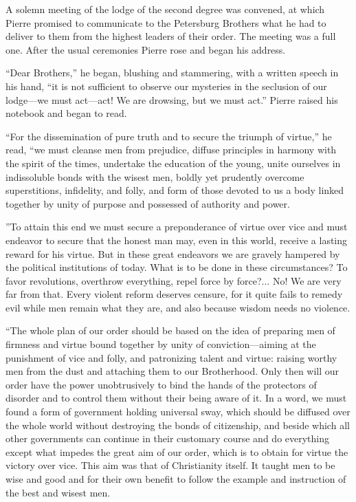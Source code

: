 A solemn meeting of the lodge of the second degree was convened,
at which Pierre promised to communicate to the Petersburg
Brothers what he had to deliver to them from the highest leaders
of their order. The meeting was a full one. After the usual
ceremonies Pierre rose and began his address.

``Dear Brothers,'' he began, blushing and stammering, with a
written speech in his hand, ``it is not sufficient to observe our
mysteries in the seclusion of our lodge---we must act---act! We
are drowsing, but we must act.'' Pierre raised his notebook and
began to read.

``For the dissemination of pure truth and to secure the triumph
of virtue,'' he read, ``we must cleanse men from prejudice,
diffuse principles in harmony with the spirit of the times,
undertake the education of the young, unite ourselves in
indissoluble bonds with the wisest men, boldly yet prudently
overcome superstitions, infidelity, and folly, and form of those
devoted to us a body linked together by unity of purpose and
possessed of authority and power.

''To attain this end we must secure a preponderance of virtue
over vice and must endeavor to secure that the honest man may,
even in this world, receive a lasting reward for his virtue. But
in these great endeavors we are gravely hampered by the political
institutions of today. What is to be done in these circumstances?
To favor revolutions, overthrow everything, repel force by
force?... No! We are very far from that.  Every violent reform
deserves censure, for it quite fails to remedy evil while men
remain what they are, and also because wisdom needs no violence.

``The whole plan of our order should be based on the idea of
preparing men of firmness and virtue bound together by unity of
conviction---aiming at the punishment of vice and folly, and
patronizing talent and virtue: raising worthy men from the dust
and attaching them to our Brotherhood.  Only then will our order
have the power unobtrusively to bind the hands of the protectors
of disorder and to control them without their being aware of
it. In a word, we must found a form of government holding
universal sway, which should be diffused over the whole world
without destroying the bonds of citizenship, and beside which all
other governments can continue in their customary course and do
everything except what impedes the great aim of our order, which
is to obtain for virtue the victory over vice. This aim was that
of Christianity itself.  It taught men to be wise and good and
for their own benefit to follow the example and instruction of
the best and wisest men.

